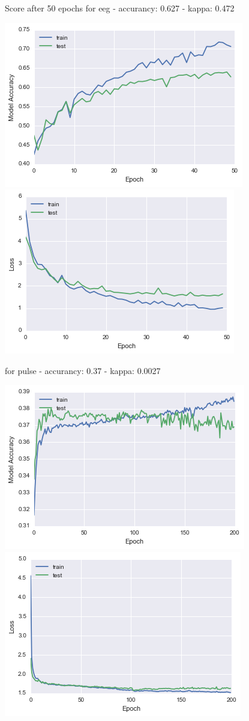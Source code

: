 \documentclass[11pt]{article}
\makeatletter
\def\maxwidth{\ifdim\Gin@nat@width>\linewidth\linewidth
    \else\Gin@nat@width\fi}
\let\Oldincludegraphics\includegraphics
\renewcommand{\includegraphics}[1]{\Oldincludegraphics[width=.8\maxwidth]{#1}}
\makeatother
\begin{document}
Score after 50 epochs for eeg - accurancy: 0.627 - kappa: 0.472

\includegraphics{eeg_acc1.png} \includegraphics{eeg_loss1.png}

for pulse - accurancy: 0.37 - kappa: 0.0027

\includegraphics{pulse_acc1.png} \includegraphics{pulse_loss1.png}
\end{document}
